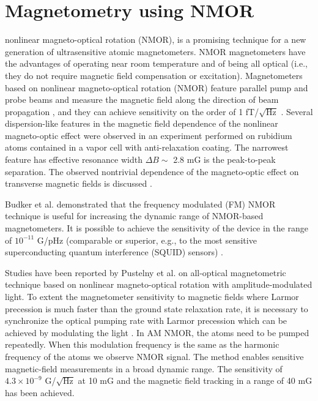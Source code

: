 \section{Magnetometry using NMOR\label{sec:magnetometry literature review}}

nonlinear magneto-optical rotation (NMOR), is a promising technique for a new generation of ultrasensitive atomic magnetometers. NMOR
magnetometers have the advantages of operating near room temperature and of being all optical
(i.e., they do not require magnetic field compensation or excitation). Magnetometers based on nonlinear
magneto-optical rotation (NMOR) feature parallel pump and probe beams and measure
the magnetic field along the direction of beam propagation \cite{bib:Budker2002} , and they can achieve sensitivity on the order of 1 fT/$\sqrt{\text{Hz}}$ \cite{bib:sensitivemagnetometry}. 
 Several dispersion-like features in the magnetic field dependence of the nonlinear magneto-optic effect
were observed in an experiment performed on rubidium atoms contained in a vapor cell with anti-relaxation
coating. The narrowest feature has effective resonance width $\Delta B \sim$ 2.8 mG is the
peak-to-peak separation. The observed nontrivial dependence of the magneto-optic effect on transverse
magnetic fields is discussed \cite{bib:UltranarrowWidths}.

Budker et al. \cite{bib:FMNMOR} demonstrated that the frequency modulated (FM) NMOR technique is useful for increasing the dynamic range of NMOR-based magnetometers.  It is possible to achieve the  sensitivity of the device in the range of  $10^{−11} $ G/pHz (comparable or superior, e.g., to the most sensitive superconducting quantum interference (SQUID) sensors)  .

 Studies have been reported by  Pustelny et al.\cite{bib:AMNMOR,bib:amNMOR} on all-optical magnetometric technique based on nonlinear magneto-optical rotation with amplitude-modulated light. To extent the magnetometer sensitivity to magnetic fields where Larmor
precession is much faster than the ground state relaxation rate, it is
necessary to synchronize the optical pumping rate with Larmor
precession which can be achieved by modulating the light
\cite{doi:10.1063/1.3225917}. In AM NMOR, the atoms need to be pumped repeatedly. When this modulation frequency is the same as the harmonic
frequency of the atoms we observe NMOR signal. The method enables sensitive magnetic-field measurements in a broad dynamic range. The sensitivity of  $4.3\times10^{-9}$ G/$\sqrt{\text{Hz}}$ at 10 mG and the magnetic field tracking in a range of 40 mG has been achieved. 

